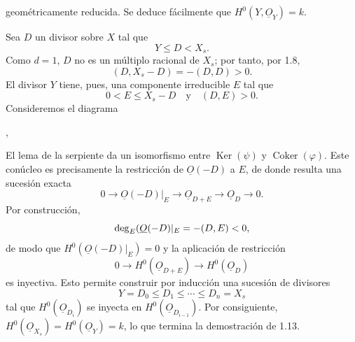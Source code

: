 geométricamente reducida. Se deduce fácilmente que
$H^0(Y,\underline{O}_Y)=k$.

Sea $D$ un divisor sobre $X$ tal que
\begin{equation*}
Y\leq D<X_s.
\end{equation*}
Como $d=1$, $D$ no es un múltiplo racional de $X_s$; por tanto, por 1.8,
\begin{equation*}
(D,X_s-D)=-(D,D)>0.
\end{equation*}
El divisor $Y$ tiene, pues, una componente irreducible $E$ tal que
\begin{equation*}
0<E\leq X_s-D\quad\text{y}\quad(D,E)>0.
\end{equation*}
Consideremos el diagrama
\begin{center}
\qquad ,
\end{center}
El lema de la serpiente da un isomorfismo entre $\operatorname{Ker}(\psi)$ y
$\operatorname{Coker}(\varphi)$. Este conúcleo es precisamente la restricción
de $\underline{O}(-D)$ a $E$, de donde resulta una sucesión exacta
\begin{equation*}
0\longrightarrow\underline{O}(-D)|_E
\longrightarrow\underline{O}_{D+E}
\longrightarrow\underline{O}_D\longrightarrow0.
\end{equation*}
Por construcción,
\begin{equation*}
\sisi{\deg_E(\underline{O}(-D)}{\deg_E(\underline{O}(-D)|_E}=-(D,E)<0,
\end{equation*}
de modo que $H^0(\underline{O}(-D)|_E)=0$ y la aplicación de restricción
\begin{equation*}
0\longrightarrow H^0(\underline{O}_{D+E})
\longrightarrow H^0(\underline{O}_D)
\end{equation*}
es inyectiva. Esto permite construir por inducción una sucesión de divisores
\begin{equation*}
Y=D_0\leq D_1\leq\cdots\leq D_n=X_s
\end{equation*}
tal que $H^0(\underline{O}_{D_i})$ se inyecta en
$H^0(\underline{O}_{D_{i-1}})$. Por consiguiente,
$H^0(\underline{O}_{X_s})=H^0(\underline{O}_Y)=k$, lo que termina la
demostración de 1.13.

